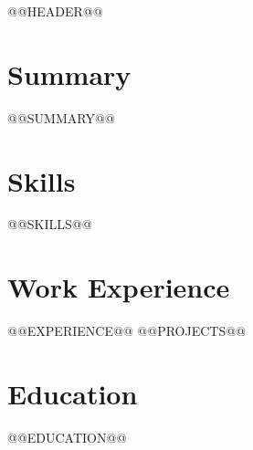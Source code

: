 \documentclass[letterpaper,10pt]{article}
\begin{document}
@@HEADER@@
\section{Summary}
\small{@@SUMMARY@@}
\vspace{-5pt}
\section{Skills}
\small{@@SKILLS@@}
\vspace{-5pt}
\section{Work Experience}
@@EXPERIENCE@@
@@PROJECTS@@
\section{Education}
@@EDUCATION@@
\end{document}
